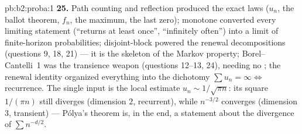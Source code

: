 \begin{solution}{pb:b2:proba:1}
\textbf{25.} Path counting and reflection produced the exact
laws ($u_n$, the ballot theorem, $f_n$, the maximum, the last
zero); monotone  converted every limiting
statement (``returns at least once'', ``infinitely often'')
into a limit of finite-horizon probabilities;
disjoint-block  powered the renewal
decompositions (questions 9, 18, 21) --- it is the 
skeleton of the Markov property; Borel--Cantelli~1 was the
transience weapon (questions 12--13, 24), needing no
; the renewal identity organized everything into
the dichotomy $\sum u_n = \infty \iff$ recurrence. The single
 input is the local estimate $u_n \sim 1/\sqrt{\pi
n}$: its square $1/(\pi n)$ still diverges (dimension $2$,
recurrent), while $n^{-3/2}$ converges (dimension $3$,
transient) --- P\'olya's theorem is, in the end, a statement
about the divergence of $\sum n^{-d/2}$.
\end{solution}
